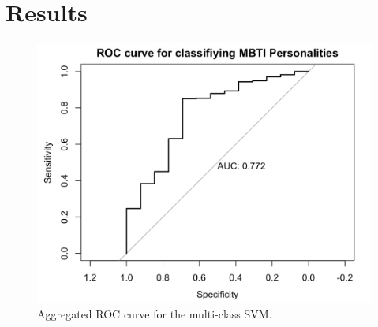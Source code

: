 \section{Results}
\label{sec:results}

\begin{figure}
\centering
  \includegraphics[scale=0.4]{ROC.png}
\caption{Aggregated ROC curve for the multi-class SVM.} %
\label{fig:ROC}
\end{figure}


